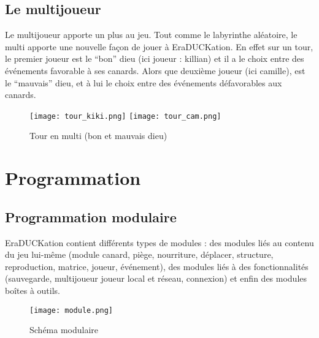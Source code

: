 ﻿\documentclass[12pt,a4paper,twoside]{article}
\begin{document}
\subsection{Le multijoueur}
Le multijoueur apporte un plus au jeu. Tout comme le labyrinthe aléatoire, le multi
apporte une nouvelle façon de jouer à EraDUCKation. En effet sur un tour, le premier joueur est le “bon” dieu (ici joueur : killian) et il a le choix entre des événements favorable à ses canards. Alors que deuxième joueur (ici camille), est le “mauvais” dieu, et à lui le choix entre des événements défavorables aux canards.
\begin{figure}[h]
\texttt{[image: tour\_kiki.png]}
\texttt{[image: tour\_cam.png]}
\caption{Tour en multi (bon et mauvais dieu)}
\end{figure}
\newpage
\section{Programmation}
\subsection{Programmation modulaire}
EraDUCKation contient différents types de modules : des modules liés au contenu du jeu lui-même (module canard, piège, nourriture, déplacer, structure, reproduction, matrice, joueur, événement), des modules liés à des fonctionnalités (sauvegarde, multijoueur joueur local et réseau, connexion) et enfin des modules boîtes à outils.
\begin{figure}[h]
\centering
\texttt{[image: module.png]}
\caption{Schéma modulaire}
\end{figure}
\end{document}
